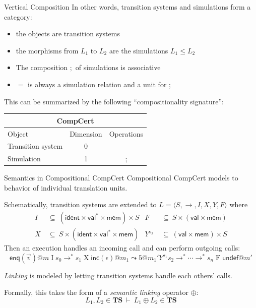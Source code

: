 \documentclass[aspectratio=1610,12pt]{beamer}
\begin{document}
\begin{frame}{Vertical Composition \fbox{$;$}} %
  In other words, transition systems and simulations form a category:
  \begin{itemize}
    \item the objects are transition systems
    \item the morphisms from $L_1$ to $L_2$ are the simulations $L_1 \le L_2$
    \item The composition $;$ of simulations is associative
    \item $=$ is always a simulation relation and a unit for $;$
  \end{itemize}

  \vfill
  This can be summarized by the following ``compositionality signature'':
  \begin{center}
    \begin{tabular}{lcc}
      \toprule
      \multicolumn{3}{c}{\textbf{CompCert}} \\
      \midrule
      Object & Dimension & Operations \\
      \midrule
      Transition system & 0 \\
      Simulation & 1 & $\mathbin;$ \\
      \bottomrule
    \end{tabular}
  \end{center}
\end{frame}

\begin{frame}{Semantics in Compositional CompCert} %
  Compositional CompCert models to behavior of individual translation units.

  \vfill
  Schematically,
  transition systems are extended to
  $L = \langle S, {\rightarrow}, I, X, Y, F \rangle$
  where
  \begin{align*}
    I &\:\subseteq\: (\mathsf{ident} \times \mathsf{val}^* \times \mathsf{mem}) \times S
    &
    F &\:\subseteq\: S \times (\mathsf{val} \times \mathsf{mem})
    \\
    X &\:\subseteq\: S \times (\mathsf{ident} \times \mathsf{val}^* \times \mathsf{mem})
    &
    Y^{s_x} &\:\subseteq\: (\mathsf{val} \times \mathsf{mem}) \times S
  \end{align*}
  Then an execution handles an incoming call and
  can perform outgoing calls:
  \[
    \mathsf{enq}(\vec{v})@m
    \mathrel{I}
    s_0 \rightarrow^* s_1
    \mathrel{X}
    \mathsf{inc}(\epsilon)@m_1 \leadsto 5@m_1'
    \mathrel{Y^{s_1}}
    s_2 \rightarrow^* \cdots \rightarrow^* s_n
    \mathrel{F}
    \mathsf{undef}@m'
  \]

  \vfill
  \emph{Linking} is modeled
  by letting transition systems
  handle each others' calls.

  Formally, this takes the form of a \emph{semantic linking} operator $\oplus$:
  \[
    L_1, L_2 \in \mathbf{TS} \: \vdash \: L_1 \oplus L_2 \in \mathbf{TS}
  \]
\end{frame}
\end{document}
